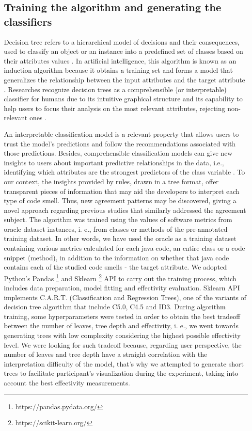 \subsection{Training the algorithm and generating the classifiers}

Decision tree refers to a hierarchical model of decisions and their consequences, used to classify an object or an instance into a predefined set of classes based on their attributes values \cite{rokach2008data}. In artificial intelligence, this algorithm is known as an induction algorithm because it obtains a training set and forms a model that generalizes the relationship between the input attributes and the target attribute \cite{rokach2008data}. 
Researches recognize decision trees as a comprehensible (or interpretable) classifier for humans \cite{guidotti2018survey} due to its intuitive graphical structure and its capability to help users to focus their analysis on the most relevant attributes, rejecting non-relevant ones \cite{freitas2014comprehensible}.

An interpretable classification model is a relevant property that allows users to trust the model's predictions and follow the recommendations associated with those predictions. Besides, comprehensible classification models can give new insights to users about important predictive relationships in the data, i.e., identifying which attributes are the strongest predictors of the class variable \cite{freitas2014comprehensible}. To our context, the insights provided by rules, drawn in a tree format, offer transparent pieces of information that may aid the developers to interpret each type of code smell. Thus, new agreement patterns may be discovered, giving a novel approach regarding previous studies \cite{hozano2018you} that similarly addressed the agreement subject. 
The algorithm was trained using the values of software metrics from oracle dataset instances, i. e., from classes or methods of the pre-annotated training dataset.  In other words, we have used the oracle as a training dataset containing various metrics calculated for each java code, an entire class or a code snippet (method), in addition to the information on whether that java code contains each of the studied code smells - the target attribute.    
We adopted Python's Pandas \footnote{https://pandas.pydata.org/} and Sklearn \footnote{https://scikit-learn.org/} API to carry out the training process, which includes data preparation, model fitting and effectivity evaluation. Sklearn API implements C.A.R.T. (Classification and Regression Trees), one of the variants of decision tree algorithm that include C5.0, C4.5 and ID3. During algorithm training, some hyperparameters were tested in order to obtain the best tradeoff between the number of leaves, tree depth and effectivity, i. e., we went towards generating trees with low complexity considering the highest possible effectivity level. We were looking for such tradeoff because, regarding user perspective, the number of leaves and tree depth have a straight correlation with the interpretation difficulty \cite{luvstrek2016makes} of the model, that's why we attempted to generate short trees to facilitate participant's visualization during the experiment, taking into account the best effectivity measurements.

